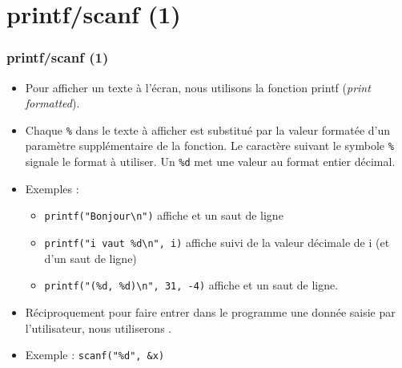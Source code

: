 \documentclass[xcolor=pdftex,svgnames,table]{beamer}
\begin{document}
\section{printf/scanf (1)}
\begin{frame}[fragile]
  \frametitle{printf/scanf (1) \nowrite}
\begin{itemize}
\item  Pour afficher un texte à l'écran, nous utilisons la fonction \alert{printf}
  (\emph{print formatted}).
\item Chaque \verb+%+
dans le texte à afficher est substitué par la valeur formatée d'un
\alert{paramètre supplémentaire} de la fonction. Le caractère suivant le
symbole \verb+%+
signale le format à utiliser.  Un \verb+%d+
met une valeur au format \alert{entier décimal}.
\pause
\item Exemples :
  \begin{itemize}
\item
    \verb+printf("Bonjour\n")+
affiche  et un saut de
    ligne\pause
\item
    \verb+printf("i vaut %d\n", i)+
affiche  suivi de la valeur décimale de i (et d'un saut de
ligne)\pause
\item
    \verb+printf("(%d, %d)\n", 31, -4)+
affiche  et un saut de ligne.
 \end{itemize}
\pause
\item Réciproquement pour faire entrer dans le programme une donnée saisie par
  l'utilisateur, nous utiliserons \alert{}.
\item Exemple : \verb+scanf("%d", &x)+
\end{itemize}
\end{frame}
\end{document}

